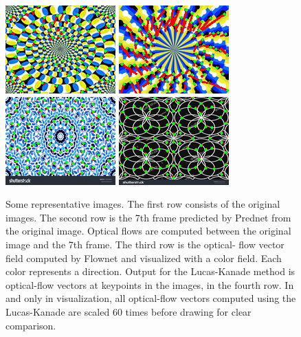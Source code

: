 \documentclass[journal]{IEEEtran}
\begin{document}
\begin{figure}
  \includegraphics[width=0.24\linewidth]{fig/lk-rotate-0.png}
  \includegraphics[width=0.24\linewidth]{fig/lk-rotate-1.png}
  \includegraphics[width=0.24\linewidth]{fig/lk-control-0.png}
  \includegraphics[width=0.24\linewidth]{fig/lk-control-1.png}

  \caption{Some representative images. The first row consists of the original images. The second row is the 7th frame predicted by Prednet from the original image. Optical flows are computed between the original image and the 7th frame. The third row is the optical- flow vector field computed by Flownet and visualized with a color field. Each color represents a direction. Output for the Lucas-Kanade method is optical-flow vectors at keypoints in the images, in the fourth row. In and only in visualization, all optical-flow vectors computed using the Lucas-Kanade are scaled 60 times before drawing for clear comparison.}
  \label{fig:representative-img-and-results}
\end{figure}
\end{document}
